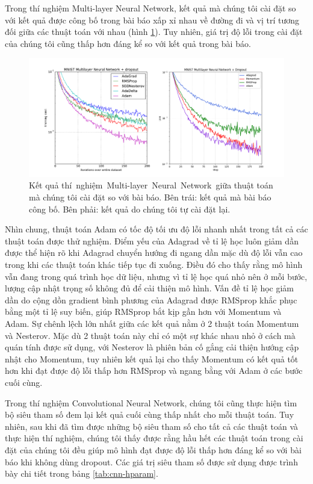 Trong thí nghiệm Multi-layer Neural Network, kết quả mà chúng tôi cài đặt so với kết quả được công bố trong bài báo xấp xỉ nhau về đường đi và vị trí tương đối giữa các thuật toán với nhau (hình \ref{fig:exp-mlp}). Tuy nhiên, giá trị độ lỗi trong cài đặt của chúng tôi cũng thấp hơn đáng kể so với kết quả trong bài báo.

\begin{figure}[htp]
	\centering
	\includegraphics[width=160 mm]{images/mlp.png}
	\caption{Kết quả thí nghiệm Multi-layer Neural Network giữa thuật toán mà chúng tôi cài đặt so với bài báo. Bên trái: kết quả mà bài báo công bố. Bên phải: kết quả do chúng tôi tự cài đặt lại.}
	\label{fig:exp-mlp}
\end{figure}

Nhìn chung, thuật toán Adam có tốc độ tối ưu độ lỗi nhanh nhất trong tất cả các thuật toán được thử nghiệm. Điểm yếu của Adagrad về tỉ lệ học luôn giảm dần được thể hiện rõ khi Adagrad chuyển hướng đi ngang dần mặc dù độ lỗi vẫn cao trong khi các thuật toán khác tiếp tục đi xuống. Điều đó cho thấy rằng mô hình vẫn đang trong quá trình học dữ liệu, nhưng vì tỉ lệ học quá nhỏ nên ở mỗi bước, lượng cập nhật trọng số không đủ để cải thiện mô hình. Vấn đề tỉ lệ học giảm dần do cộng dồn gradient bình phương của Adagrad được RMSprop khắc phục bằng một tỉ lệ suy biến, giúp RMSprop bắt kịp gần hơn với Momentum và Adam. Sự chênh lệch lớn nhất giữa các kết quả nằm ở 2 thuật toán Momentum và Nesterov. Mặc dù 2 thuật toán này chỉ có một sự khác nhau nhỏ ở cách mà quán tính được sử dụng, với Nesterov là phiên bản cố gắng cải thiện hướng cập nhật cho Momentum, tuy nhiên kết quả lại cho thấy Momentum có kết quả tốt hơn khi đạt được độ lỗi thấp hơn RMSprop và ngang bằng với Adam ở các bước cuối cùng.

Trong thí nghiệm Convolutional Neural Network, chúng tôi cũng thực hiện tìm bộ siêu tham số đem lại kết quả cuối cùng thấp nhất cho mỗi thuật toán. Tuy nhiên, sau khi đã tìm được những bộ siêu tham số cho tất cả các thuật toán và thực hiện thí nghiệm, chúng tôi thấy được rằng hầu hết các thuật toán trong cài đặt của chúng tôi đều giúp mô hình đạt được độ lỗi thấp hơn đáng kể so với bài báo khi không dùng dropout. Các giá trị siêu tham số được sử dụng được trình bày chi tiết trong bảng \ref{tab:cnn-hparam}.

